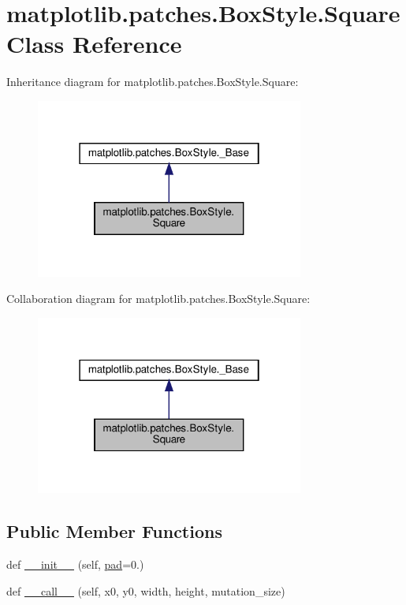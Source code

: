 \hypertarget{classmatplotlib_1_1patches_1_1BoxStyle_1_1Square}{}\section{matplotlib.\+patches.\+Box\+Style.\+Square Class Reference}
\label{classmatplotlib_1_1patches_1_1BoxStyle_1_1Square}


Inheritance diagram for matplotlib.\+patches.\+Box\+Style.\+Square\+:
\nopagebreak
\begin{figure}[H]
\begin{center}
\leavevmode
\includegraphics[width=250pt]{classmatplotlib_1_1patches_1_1BoxStyle_1_1Square__inherit__graph}
\end{center}
\end{figure}


Collaboration diagram for matplotlib.\+patches.\+Box\+Style.\+Square\+:
\nopagebreak
\begin{figure}[H]
\begin{center}
\leavevmode
\includegraphics[width=250pt]{classmatplotlib_1_1patches_1_1BoxStyle_1_1Square__coll__graph}
\end{center}
\end{figure}
\subsection*{Public Member Functions}
\begin{DoxyCompactItemize}
\item 
def \hyperlink{classmatplotlib_1_1patches_1_1BoxStyle_1_1Square_a075e60ee3f21011554551e08a78ebff2}{\+\_\+\+\_\+init\+\_\+\+\_\+} (self, \hyperlink{classmatplotlib_1_1patches_1_1BoxStyle_1_1Square_a4a36206a4868c89251482d499c23b483}{pad}=0.)
\item 
def \hyperlink{classmatplotlib_1_1patches_1_1BoxStyle_1_1Square_ad623c3121543c7610233b6d8d35c9806}{\+\_\+\+\_\+call\+\_\+\+\_\+} (self, x0, y0, width, height, mutation\+\_\+size)
\end{DoxyCompactItemize}
